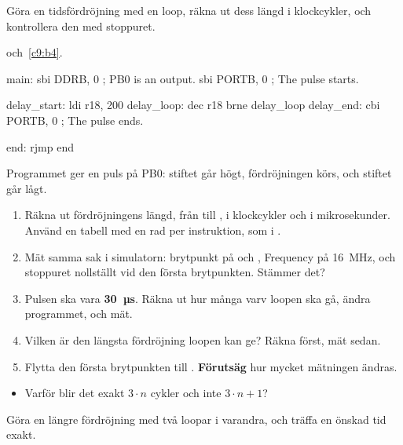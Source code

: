 \label{lab3:d15}
Göra en tidsfördröjning med en loop, räkna ut dess längd i klockcykler, och kontrollera den med
stoppuret.

 och~\ref{c9:b4}.

\begin{asmcode}
main:
    sbi DDRB, 0                     ; PB0 is an output.
    sbi PORTB, 0                    ; The pulse starts.

delay_start:
    ldi r18, 200
delay_loop:
    dec r18
    brne delay_loop
delay_end:
    cbi PORTB, 0                    ; The pulse ends.

end:
    rjmp end
\end{asmcode}

Programmet ger en puls på PB0: stiftet går högt, fördröjningen körs, och stiftet går lågt.

\begin{enumerate}
  \item Räkna ut fördröjningens längd, från  till , i
    klockcykler och i mikrosekunder. Använd en tabell med en rad per instruktion, som i
    .
  \item Mät samma sak i simulatorn: brytpunkt på  och ,
    Frequency på 16~MHz, och stoppuret nollställt vid den första brytpunkten. Stämmer det?
  \item Pulsen ska vara \textbf{30~µs}. Räkna ut hur många varv loopen ska gå, ändra programmet, och
    mät.
  \item Vilken är den längsta fördröjning loopen kan ge? Räkna först, mät sedan.
  \item Flytta den första brytpunkten till . \textbf{Förutsäg} hur mycket
    mätningen ändras.
\end{enumerate}

\begin{itemize}
  \item Varför blir det exakt $3 \cdot n$ cykler och inte $3 \cdot n + 1$?
\end{itemize}


\label{lab3:d16}
Göra en längre fördröjning med två loopar i varandra, och träffa en önskad tid exakt.

